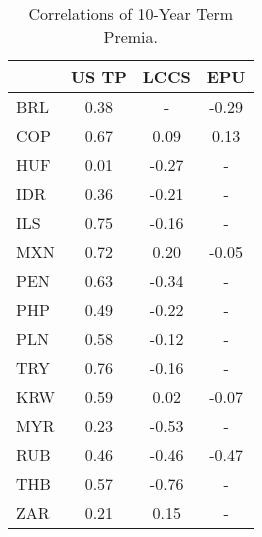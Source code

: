 \begin{tiny}\begin{table}\centering\begin{tabular}{l|ccc}\toprule & US TP & LCCS & EPU \\\midrule BRL & 0.38 & - & -0.29 \\COP & 0.67 & 0.09 & 0.13 \\HUF & 0.01 & -0.27 & - \\IDR & 0.36 & -0.21 & - \\ILS & 0.75 & -0.16 & - \\MXN & 0.72 & 0.20 & -0.05 \\PEN & 0.63 & -0.34 & - \\PHP & 0.49 & -0.22 & - \\PLN & 0.58 & -0.12 & - \\TRY & 0.76 & -0.16 & - \\KRW & 0.59 & 0.02 & -0.07 \\MYR & 0.23 & -0.53 & - \\RUB & 0.46 & -0.46 & -0.47 \\THB & 0.57 & -0.76 & - \\ZAR & 0.21 & 0.15 & - \\\bottomrule\end{tabular}\caption{Correlations of 10-Year Term Premia.}\label{table:Correls10yr}\end{table}\end{tiny}